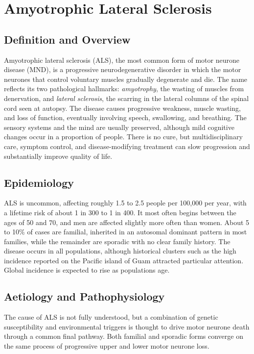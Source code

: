 \chapter{Amyotrophic Lateral Sclerosis}

\section*{Definition and Overview}
Amyotrophic lateral sclerosis (ALS), the most common form of motor neurone disease (MND), is a progressive neurodegenerative disorder in which the motor neurones that control voluntary muscles gradually degenerate and die. The name reflects its two pathological hallmarks: \emph{amyotrophy}, the wasting of muscles from denervation, and \emph{lateral sclerosis}, the scarring in the lateral columns of the spinal cord seen at autopsy. The disease causes progressive weakness, muscle wasting, and loss of function, eventually involving speech, swallowing, and breathing. The sensory systems and the mind are usually preserved, although mild cognitive changes occur in a proportion of people. There is no cure, but multidisciplinary care, symptom control, and disease-modifying treatment can slow progression and substantially improve quality of life.

\section*{Epidemiology}
ALS is uncommon, affecting roughly 1.5 to 2.5 people per 100,000 per year, with a lifetime risk of about 1 in 300 to 1 in 400. It most often begins between the ages of 50 and 70, and men are affected slightly more often than women. About 5 to 10\% of cases are familial, inherited in an autosomal dominant pattern in most families, while the remainder are sporadic with no clear family history. The disease occurs in all populations, although historical clusters such as the high incidence reported on the Pacific island of Guam attracted particular attention. Global incidence is expected to rise as populations age.

\section*{Aetiology and Pathophysiology}
The cause of ALS is not fully understood, but a combination of genetic susceptibility and environmental triggers is thought to drive motor neurone death through a common final pathway. Both familial and sporadic forms converge on the same process of progressive upper and lower motor neurone loss.

